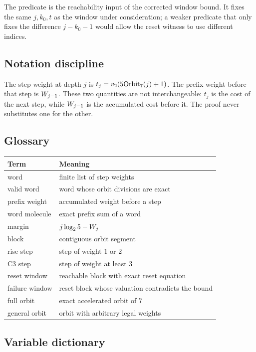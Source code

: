 The predicate is the reachability input of the corrected window bound.
It fixes the same $j,k_0,t$ as the window under consideration; a weaker
predicate that only fixes the difference $j-k_0-1$ would allow the
reset witness to use different indices.

\subsection{Notation discipline}

The step weight at depth $j$ is $t_j=v_2\!\left(5\mathrm{Orbit}_7(j)+1\right)$.  The
prefix weight before that step is $W_{j-1}$.  These two
quantities are not interchangeable: $t_j$ is the cost of the next step,
while $W_{j-1}$ is the accumulated cost before it.  The proof
never substitutes one for the other.

\subsection{Glossary}

\begin{center}
\small
\begin{tabular}{@{}p{}p{}@{}}
\toprule
Term & Meaning \\
\midrule
word & finite list of step weights \\
valid word & word whose orbit divisions are exact \\
prefix weight & accumulated weight before a step \\
word molecule & exact prefix sum of a word \\
margin & $j\log_2 5-W_j$ \\
block & contiguous orbit segment \\
rise step & step of weight $1$ or $2$ \\
C3 step & step of weight at least $3$ \\
reset window & reachable block with exact reset equation \\
failure window & reset block whose valuation contradicts the bound \\
full orbit & exact accelerated orbit of $7$ \\
general orbit & orbit with arbitrary legal weights \\
\bottomrule
\end{tabular}
\end{center}

\subsection{Variable dictionary}

